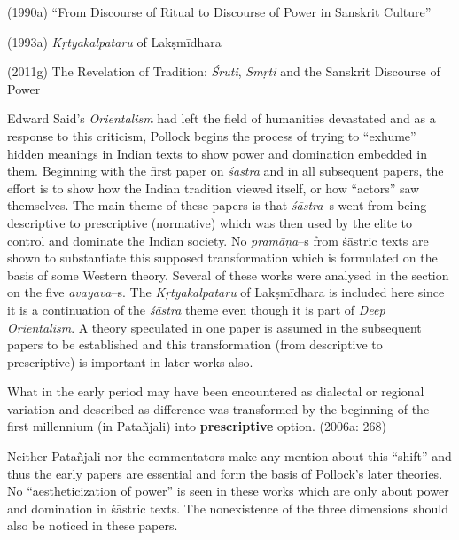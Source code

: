 {{\newpage

(1990a) “From Discourse of Ritual to Discourse of Power in Sanskrit Culture”

(1993a) \textit{Kṛtyakalpataru} of Lakṣmīdhara

(2011g) The Revelation of Tradition: \textit{Śruti}, \textit{Smṛti} and the Sanskrit Discourse of Power

Edward Said’s \textit{Orientalism} had left the field of humanities devastated and as a response to this criticism, Pollock begins the process of trying to “exhume” hidden meanings in Indian texts to show power and domination embedded in them. Beginning with the first paper on \textit{śāstra} and in all subsequent papers, the effort is to show how the Indian tradition viewed itself, or how “actors” saw themselves. The main theme of these papers is that \textit{śāstra}–s went from being descriptive to prescriptive (normative) which was then used by the elite to control and dominate the Indian society. No \textit{pramāṇa}–s from śāstric texts are shown to substantiate this supposed transformation which is formulated on the basis of some Western theory. Several of these works were analysed in the section on the five \textit{avayava}–s\break [4.6]. The \textit{Kṛtyakalpataru} of Lakṣmīdhara is included here since it is a continuation of the \textit{śāstra} theme even though it is part of \textit{Deep Orientalism}. A theory speculated in one paper is assumed in the subsequent papers to be established and this transformation (from descriptive to prescriptive) is important in later works also.

\begin{myquote}
What in the early period may have been encountered as dialectal or regional variation and described as difference was transformed by the beginning of the ﬁrst millennium (in Patañjali) into \textbf{prescriptive} option. (2006a: 268)
\end{myquote}

Neither Patañjali nor the commentators make any mention about this “shift” and thus the early papers are essential and form the basis of Pollock’s later theories. No “aestheticization of power” is seen in these works which are only about power and domination in śāstric texts. The nonexistence of the three dimensions should also be noticed in these papers.

}}
